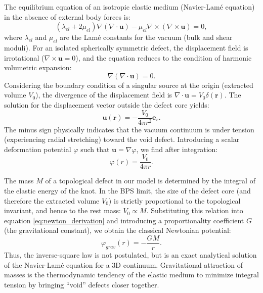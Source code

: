 \documentclass[12pt,a4paper]{article}
\begin{document}
The equilibrium equation of an isotropic elastic medium (Navier-Lamé equation) in the absence of external body forces is:
\begin{equation}
	(\lambda_{el} + 2\mu_{el}) \nabla (\nabla \cdot \mathbf{u}) - \mu_{el} \nabla \times (\nabla \times \mathbf{u}) = 0,
\end{equation}
where $\lambda_{el}$ and $\mu_{el}$ are the Lamé constants for the vacuum (bulk and shear moduli). 
For an isolated spherically symmetric defect, the displacement field is irrotational ($\nabla \times \mathbf{u} = 0$), and the equation reduces to the condition of harmonic volumetric expansion:
\begin{equation}
	\nabla (\nabla \cdot \mathbf{u}) = 0.
\end{equation}
Considering the boundary condition of a singular source at the origin (extracted volume $V_0$), the divergence of the displacement field is $\nabla \cdot \mathbf{u} = V_0 \delta(\mathbf{r})$. The solution for the displacement vector outside the defect core yields:
\begin{equation}
	\mathbf{u}(\mathbf{r}) = -\frac{V_0}{4\pi r^2} \mathbf{e}_r.
\end{equation}
The minus sign physically indicates that the vacuum continuum is under tension (experiencing radial stretching) toward the void defect. Introducing a scalar deformation potential $\varphi$ such that $\mathbf{u} = \nabla \varphi$, we find after integration:
\begin{equation}
	\varphi(r) = \frac{V_0}{4\pi r}.
	\label{eq:newton_derivation}
\end{equation}

The mass $M$ of a topological defect in our model is determined by the integral of the elastic energy of the knot. In the BPS limit, the size of the defect core (and therefore the extracted volume $V_0$) is strictly proportional to the topological invariant, and hence to the rest mass: $V_0 \propto M$. Substituting this relation into equation \eqref{eq:newton_derivation} and introducing a proportionality coefficient $G$ (the gravitational constant), we obtain the classical Newtonian potential:
\begin{equation}
	\varphi_{grav}(r) = - \frac{G M}{r}.
\end{equation}
Thus, the inverse-square law is not postulated, but is an exact analytical solution of the Navier-Lamé equation for a 3D continuum. Gravitational attraction of masses is the thermodynamic tendency of the elastic medium to minimize integral tension by bringing ``void'' defects closer together.
\end{document}
